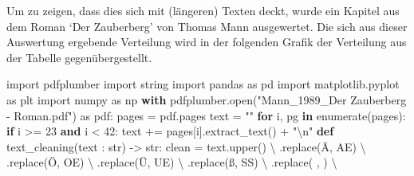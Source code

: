 \documentclass[
  nswissgerman,
  a4paper,
  DIV=11,
  numbers=noendperiod,
  ngerman]{scrreprt}
\newenvironment{Shaded}{\begin{snugshade}}{\end{snugshade}}
\newcommand{\BuiltInTok}[1]{\textcolor[rgb]{0.00,0.23,0.31}{#1}}
\newcommand{\CharTok}[1]{\textcolor[rgb]{0.13,0.47,0.30}{#1}}
\newcommand{\ControlFlowTok}[1]{\textcolor[rgb]{0.00,0.23,0.31}{\textbf{#1}}}
\newcommand{\DecValTok}[1]{\textcolor[rgb]{0.68,0.00,0.00}{#1}}
\newcommand{\ImportTok}[1]{\textcolor[rgb]{0.00,0.46,0.62}{#1}}
\newcommand{\KeywordTok}[1]{\textcolor[rgb]{0.00,0.23,0.31}{\textbf{#1}}}
\newcommand{\NormalTok}[1]{\textcolor[rgb]{0.00,0.23,0.31}{#1}}
\newcommand{\OperatorTok}[1]{\textcolor[rgb]{0.37,0.37,0.37}{#1}}
\newcommand{\StringTok}[1]{\textcolor[rgb]{0.13,0.47,0.30}{#1}}
\begin{document}
Um zu zeigen, dass dies sich mit (längeren) Texten deckt, wurde ein
Kapitel aus dem Roman `Der Zauberberg' von Thomas Mann ausgewertet. Die
sich aus dieser Auswertung ergebende Verteilung wird in der folgenden
Grafik der Verteilung aus der Tabelle gegenübergestellt.

\begin{Shaded}
\begin{Highlighting}[numbers=left,,]
\ImportTok{import}\NormalTok{ pdfplumber}
\ImportTok{import}\NormalTok{ string}
\ImportTok{import}\NormalTok{ pandas }\ImportTok{as}\NormalTok{ pd}
\ImportTok{import}\NormalTok{ matplotlib.pyplot }\ImportTok{as}\NormalTok{ plt}
\ImportTok{import}\NormalTok{ numpy }\ImportTok{as}\NormalTok{ np}
\ControlFlowTok{with}\NormalTok{ pdfplumber.}\BuiltInTok{open}\NormalTok{(}\StringTok{"Mann\_1989\_Der Zauberberg {-} Roman.pdf"}\NormalTok{) }\ImportTok{as}\NormalTok{ pdf:}
\NormalTok{    pages }\OperatorTok{=}\NormalTok{ pdf.pages}
\NormalTok{    text }\OperatorTok{=} \StringTok{""}
    \ControlFlowTok{for}\NormalTok{ i, pg }\KeywordTok{in} \BuiltInTok{enumerate}\NormalTok{(pages):}
        \ControlFlowTok{if}\NormalTok{ i }\OperatorTok{\textgreater{}=} \DecValTok{23} \KeywordTok{and}\NormalTok{ i }\OperatorTok{\textless{}} \DecValTok{42}\NormalTok{:}
\NormalTok{            text }\OperatorTok{+=}\NormalTok{ pages[i].extract\_text() }\OperatorTok{+} \StringTok{"}\CharTok{\textbackslash{}n}\StringTok{"}
\KeywordTok{def}\NormalTok{ text\_cleaning(text : }\BuiltInTok{str}\NormalTok{) }\OperatorTok{{-}\textgreater{}} \BuiltInTok{str}\NormalTok{:}
\NormalTok{    clean }\OperatorTok{=}\NormalTok{ text.upper() }\OperatorTok{\textbackslash{}}
\NormalTok{                .replace(}\StringTok{\textquotesingle{}Ä\textquotesingle{}}\NormalTok{, }\StringTok{\textquotesingle{}AE\textquotesingle{}}\NormalTok{) }\OperatorTok{\textbackslash{}}
\NormalTok{                .replace(}\StringTok{\textquotesingle{}Ö\textquotesingle{}}\NormalTok{, }\StringTok{\textquotesingle{}OE\textquotesingle{}}\NormalTok{) }\OperatorTok{\textbackslash{}}
\NormalTok{                .replace(}\StringTok{\textquotesingle{}Ü\textquotesingle{}}\NormalTok{, }\StringTok{\textquotesingle{}UE\textquotesingle{}}\NormalTok{) }\OperatorTok{\textbackslash{}}
\NormalTok{                .replace(}\StringTok{\textquotesingle{}ß\textquotesingle{}}\NormalTok{, }\StringTok{\textquotesingle{}SS\textquotesingle{}}\NormalTok{) }\OperatorTok{\textbackslash{}}
\NormalTok{                .replace(}\StringTok{\textquotesingle{} \textquotesingle{}}\NormalTok{, }\StringTok{\textquotesingle{}\textquotesingle{}}\NormalTok{) }\OperatorTok{\textbackslash{}}


\end{Highlighting}
\end{Shaded}
\end{document}
